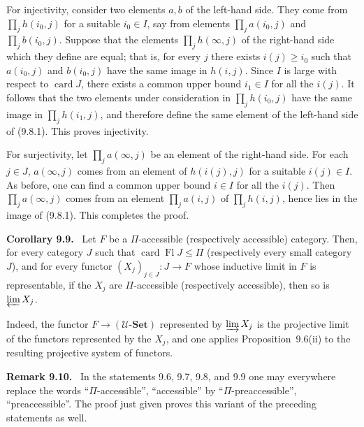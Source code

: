 \documentclass[11pt]{article}
\newcommand{\U}{\mathcal{U}}
\newcommand{\Set}{\mathbf{Set}}
\newcommand{\card}{\operatorname{card}}
\newcommand{\Fl}{\operatorname{Fl}}
\newenvironment{statement}[1]{\par\medskip\noindent\textbf{#1.}\ }{\par\medskip}
\newenvironment{remarktext}[1]{\par\medskip\noindent\textbf{#1.}\ }{\par\medskip}
\begin{document}
For injectivity, consider two elements $a,b$ of the left-hand side. They come from $\prod_j h(i_0,j)$ for a suitable $i_0\in I$, say from elements $\prod_j a(i_0,j)$ and $\prod_j b(i_0,j)$. Suppose that the elements $\prod_j h(\infty,j)$ of the right-hand side which they define are equal; that is, for every $j$ there exists $i(j)\geq i_0$ such that $a(i_0,j)$ and $b(i_0,j)$ have the same image in $h(i,j)$. Since $I$ is large with respect to $\card J$, there exists a common upper bound $i_1\in I$ for all the $i(j)$. It follows that the two elements under consideration in $\prod_j h(i_0,j)$ have the same image in $\prod_j h(i_1,j)$, and therefore define the same element of the left-hand side of (9.8.1). This proves injectivity.

For surjectivity, let $\prod_j a(\infty,j)$ be an element of the right-hand side. For each $j\in J$, $a(\infty,j)$ comes from an element of $h(i(j),j)$ for a suitable $i(j)\in I$. As before, one can find a common upper bound $i\in I$ for all the $i(j)$. Then $\prod_j a(\infty,j)$ comes from an element $\prod_j a(i,j)$ of $\prod_j h(i,j)$, hence lies in the image of (9.8.1). This completes the proof.

\begin{statement}{Corollary 9.9}
Let $F$ be a $\Pi$-accessible (respectively accessible) category. Then, for every category $J$ such that $\card\Fl J\leq \Pi$ (respectively every small category $J$), and for every functor $(X_j)_{j\in J}:J\to F$ whose inductive limit in $F$ is representable, if the $X_j$ are $\Pi$-accessible (respectively accessible), then so is $\varprojlim X_j$.
\end{statement}

Indeed, the functor $F\to(\U\text{-}\Set)$ represented by $\varinjlim X_j$ is the projective limit of the functors represented by the $X_j$, and one applies Proposition~9.6(ii) to the resulting projective system of functors.

\begin{remarktext}{Remark 9.10}
In the statements 9.6, 9.7, 9.8, and 9.9 one may everywhere replace the words ``$\Pi$-accessible'', ``accessible'' by ``$\Pi$-preaccessible'', ``preaccessible''. The proof just given proves this variant of the preceding statements as well.
\end{remarktext}
\end{document}

